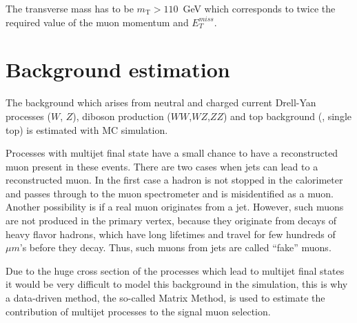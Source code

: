 The transverse mass has to be $m_\mathrm{T} > 110$~GeV which corresponds to twice the required  value of the muon
momentum and $E_T^{miss}$.


\section{Background estimation}
\label{sec:wprime_backgroundEstimation}

The background which arises from neutral and charged current Drell-Yan processes ($W$, $Z$), diboson production ($WW$,$WZ$,$ZZ$) and top background  (\ttbar, single top) is estimated with MC simulation.

Processes with multijet final state have a small chance 
to have a reconstructed muon present in these events.
There are two cases when jets can lead to a reconstructed muon. 
In the first case a hadron is not stopped in the calorimeter and passes through to the muon spectrometer and is misidentified as a muon. Another possibility is if a real muon originates from a jet. However, such muons are not produced in the primary vertex, because they originate from decays of heavy flavor hadrons, which have long lifetimes and travel for few hundreds of $\mu m$'s before they decay.
Thus, such muons from jets are called ``fake'' muons.

Due to the huge cross section of the processes which lead to multijet final states 
it would be very difficult to model this background in the simulation,
this is why a data-driven method,
the so-called Matrix Method, is used to estimate the contribution of multijet processes to the signal muon selection.

